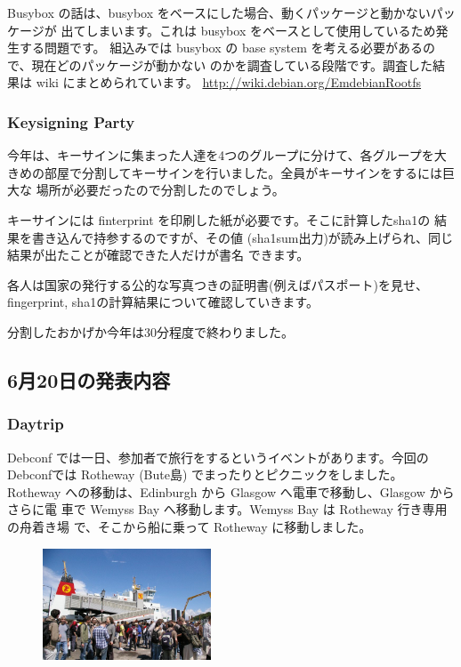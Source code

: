 \documentclass[mingoth,a4paper]{jsarticle}
\begin{document}
  Busybox の話は、busybox をベースにした場合、動くパッケージと動かないパッケージが
  出てしまいます。これは busybox をベースとして使用しているため発生する問題です。
  組込みでは busybox の base system を考える必要があるので、現在どのパッケージが動かない
  のかを調査している段階です。調査した結果は wiki にまとめられています。
  \url{http://wiki.debian.org/EmdebianRootfs}

\subsubsection{Keysigning Party}

今年は、キーサインに集まった人達を4つのグループに分けて、各グループを大
きめの部屋で分割してキーサインを行いました。全員がキーサインをするには巨大な
場所が必要だったので分割したのでしょう。

キーサインには finterprint を印刷した紙が必要です。そこに計算したsha1の
結果を書き込んで持参するのですが、その値
(sha1sum出力)が読み上げられ、同じ結果が出たことが確認できた人だけが書名
できます。

各人は国家の発行する公的な写真つきの証明書(例えばパスポート)を見せ、
fingerprint, sha1の計算結果について確認していきます。

分割したおかげか今年は30分程度で終わりました。

\subsection{6月20日の発表内容}
\subsubsection{Daytrip}

Debconf では一日、参加者で旅行をするというイベントがあります。今回の
Debconfでは Rotheway (Bute島) でまったりとピクニックをしました。Rotheway 
への移動は、Edinburgh から Glasgow へ電車で移動し、Glasgow からさらに電
車で Wemyss Bay へ移動します。Wemyss Bay は Rotheway 行き専用の舟着き場
で、そこから船に乗って Rotheway に移動しました。

\begin{figure}
\includegraphics[width=5cm]{image200706/debconf7-daytrip.jpg}
\end{figure}
\end{document}
